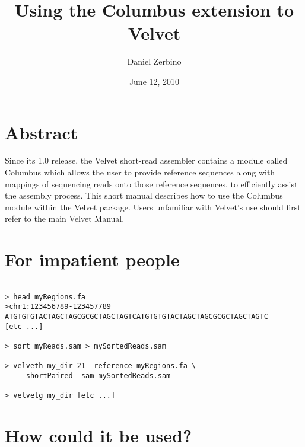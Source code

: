 \documentclass[12pt]{article}
\begin{document}
\title{Using the Columbus extension to Velvet}
\author{Daniel Zerbino}
\date{June 12, 2010}
\maketitle

\section*{Abstract}

Since its 1.0 release, the Velvet short-read assembler contains a module called Columbus which allows the user to provide reference sequences along with mappings of sequencing reads onto those reference sequences, to efficiently assist the assembly process. This short manual describes how to use the Columbus module within the Velvet package. Users unfamiliar with Velvet's use should first refer to the main Velvet Manual.

\section{For impatient people}

\begin{verbatim}

> head myRegions.fa
>chr1:123456789-123457789
ATGTGTGTACTAGCTAGCGCGCTAGCTAGTCATGTGTGTACTAGCTAGCGCGCTAGCTAGTC
[etc ...]

> sort myReads.sam > mySortedReads.sam

> velveth my_dir 21 -reference myRegions.fa \
	-shortPaired -sam mySortedReads.sam

> velvetg my_dir [etc ...]

\end{verbatim}

\section{How could it be used?}
\end{document}
